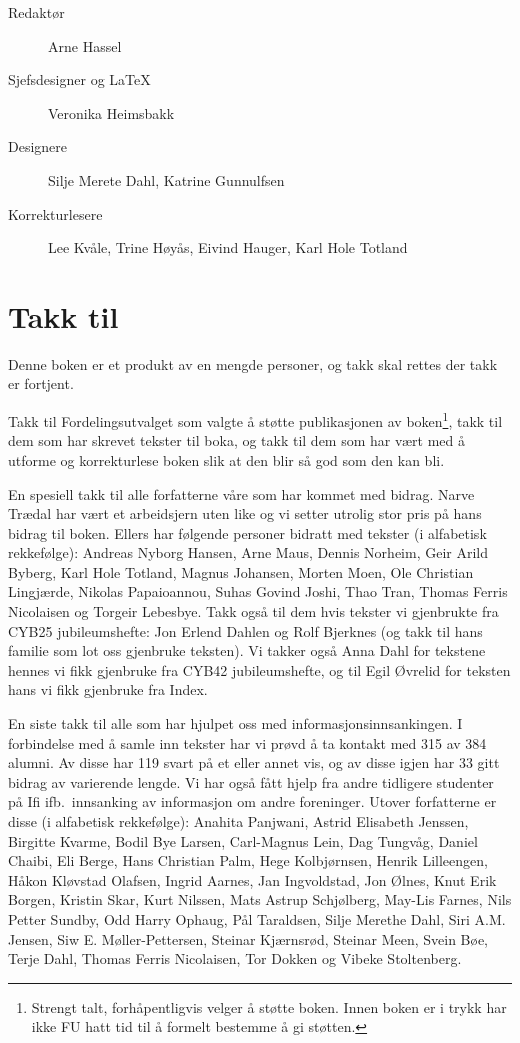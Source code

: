 \begin{description}
	\item[Redaktør] Arne Hassel
	\item[Sjefsdesigner og \LaTeX{}] Veronika Heimsbakk
	\item[Designere] Silje Merete Dahl, Katrine Gunnulfsen
	\item[Korrekturlesere] Lee Kvåle, Trine Høyås, Eivind Hauger, Karl Hole Totland
\end{description}

\section*{Takk til}

Denne boken er et produkt av en mengde personer, og takk skal rettes der takk er fortjent.

Takk til Fordelingsutvalget som valgte å støtte publikasjonen av boken\footnote{Strengt talt, forhåpentligvis velger å støtte boken. Innen boken er i trykk har ikke FU hatt tid til å formelt bestemme å gi støtten.}, takk til dem som har skrevet tekster til boka, og takk til dem som har vært med å utforme og korrekturlese boken slik at den blir så god som den kan bli.

En spesiell takk til alle forfatterne våre som har kommet med bidrag. Narve Trædal har vært et arbeidsjern uten like og vi setter utrolig stor pris på hans bidrag til boken. Ellers har følgende personer bidratt med tekster (i alfabetisk rekkefølge): Andreas Nyborg Hansen, Arne Maus, Dennis Norheim, Geir Arild Byberg, Karl Hole Totland, Magnus Johansen, Morten Moen, Ole Christian Lingjærde, Nikolas Papaioannou, Suhas Govind Joshi, Thao Tran, Thomas Ferris Nicolaisen og Torgeir Lebesbye. Takk også til dem hvis tekster vi gjenbrukte fra CYB25 jubileumshefte: Jon Erlend Dahlen og Rolf Bjerknes (og takk til hans familie som lot oss gjenbruke teksten). Vi takker også Anna Dahl for tekstene hennes vi fikk gjenbruke fra CYB42 jubileumshefte, og til Egil Øvrelid for teksten hans vi fikk gjenbruke fra Index.

En siste takk til alle som har hjulpet oss med informasjonsinnsankingen. I forbindelse med å samle inn tekster har vi prøvd å ta kontakt med 315 av 384 alumni. Av disse har 119 svart på et eller annet vis, og av disse igjen har 33 gitt bidrag av varierende lengde. Vi har også fått hjelp fra andre tidligere studenter på Ifi ifb.~innsanking av informasjon om andre foreninger. Utover forfatterne er disse (i alfabetisk rekkefølge): Anahita Panjwani, Astrid Elisabeth Jenssen, Birgitte Kvarme, Bodil Bye Larsen, Carl-Magnus Lein, Dag Tungvåg, Daniel Chaibi, Eli Berge, Hans Christian Palm, Hege Kolbjørnsen, Henrik Lilleengen, Håkon Kløvstad Olafsen, Ingrid Aarnes, Jan Ingvoldstad, Jon Ølnes, Knut Erik Borgen, Kristin Skar, Kurt Nilssen, Mats Astrup Schjølberg, May-Lis Farnes, Nils Petter Sundby, Odd Harry Ophaug, Pål Taraldsen, Silje Merethe Dahl, Siri A.M. Jensen, Siw E. Møller-Pettersen, Steinar Kjærnsrød, Steinar Meen, Svein Bøe, Terje Dahl, Thomas Ferris Nicolaisen, Tor Dokken og Vibeke Stoltenberg.


